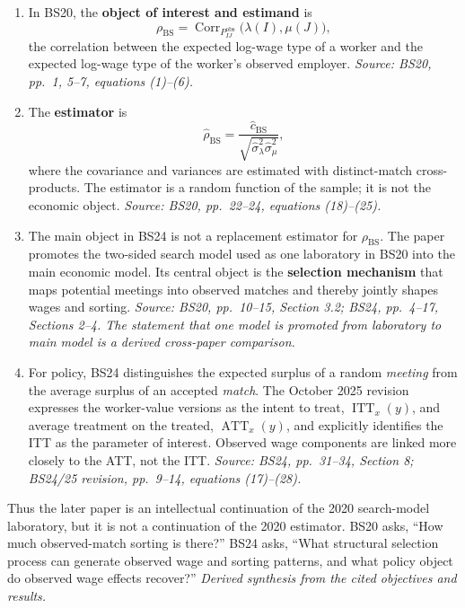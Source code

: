 \documentclass[11pt]{article}
\begin{document}
\begin{enumerate}
\item In BS20, the \textbf{object of interest and estimand} is
  \[
  \rho_{\mathrm{BS}}
  =
  \operatorname{Corr}_{P^{\mathrm{obs}}_{IJ}}
  \bigl(\lambda(I),\mu(J)\bigr),
  \]
  the correlation between the expected log-wage type of a worker and the
  expected log-wage type of the worker's observed employer.
  \textit{Source: BS20, pp.\ 1, 5--7, equations (1)--(6).}
\item The \textbf{estimator} is
  \[
  \widehat\rho_{\mathrm{BS}}
  =
  \frac{\widehat c_{\mathrm{BS}}}
  {\sqrt{\widehat\sigma_\lambda^2\widehat\sigma_\mu^2}},
  \]
  where the covariance and variances are estimated with distinct-match
  cross-products.  The estimator is a random function of the sample; it is not
  the economic object.
  \textit{Source: BS20, pp.\ 22--24, equations (18)--(25).}
\item The main object in BS24 is not a replacement estimator for
  \(\rho_{\mathrm{BS}}\).  The paper promotes the two-sided search model used
  as one laboratory in BS20 into the main economic model.  Its central object
  is the \textbf{selection mechanism} that maps potential meetings into
  observed matches and thereby jointly shapes wages and sorting.
  \textit{Source: BS20, pp.\ 10--15, Section 3.2; BS24, pp.\ 4--17,
  Sections 2--4.  The statement that one model is promoted from laboratory to
  main model is a derived cross-paper comparison.}
\item For policy, BS24 distinguishes the expected surplus of a random
  \emph{meeting} from the average surplus of an accepted \emph{match}.  The
  October 2025 revision expresses the worker-value versions as the intent to
  treat, \(\operatorname{ITT}_x(y)\), and average treatment on the treated,
  \(\operatorname{ATT}_x(y)\), and explicitly identifies the ITT as the
  parameter of interest.  Observed wage components are linked more closely to
  the ATT, not the ITT.
  \textit{Source: BS24, pp.\ 31--34, Section 8; BS24/25 revision,
  pp.\ 9--14, equations (17)--(28).}
\end{enumerate}

Thus the later paper is an intellectual continuation of the 2020 search-model
laboratory, but it is not a continuation of the 2020 estimator.  BS20 asks,
``How much observed-match sorting is there?''  BS24 asks, ``What structural
selection process can generate observed wage and sorting patterns, and what
policy object do observed wage effects recover?''  \textit{Derived synthesis
from the cited objectives and results.}
\end{document}
